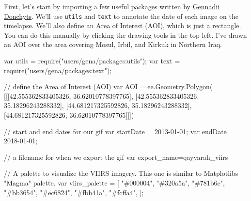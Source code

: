 \documentclass[
  letterpaper,
  DIV=11,
  numbers=noendperiod]{scrreprt}
\newenvironment{Shaded}{\begin{snugshade}}{\end{snugshade}}
\newcommand{\AttributeTok}[1]{\textcolor[rgb]{0.40,0.45,0.13}{#1}}
\newcommand{\CommentTok}[1]{\textcolor[rgb]{0.37,0.37,0.37}{#1}}
\newcommand{\FloatTok}[1]{\textcolor[rgb]{0.68,0.00,0.00}{#1}}
\newcommand{\FunctionTok}[1]{\textcolor[rgb]{0.28,0.35,0.67}{#1}}
\newcommand{\KeywordTok}[1]{\textcolor[rgb]{0.00,0.23,0.31}{#1}}
\newcommand{\NormalTok}[1]{\textcolor[rgb]{0.00,0.23,0.31}{#1}}
\newcommand{\OperatorTok}[1]{\textcolor[rgb]{0.37,0.37,0.37}{#1}}
\newcommand{\PreprocessorTok}[1]{\textcolor[rgb]{0.68,0.00,0.00}{#1}}
\newcommand{\StringTok}[1]{\textcolor[rgb]{0.13,0.47,0.30}{#1}}
\begin{document}
First, let's start by importing a few useful packages written by
\href{https://twitter.com/gena_d}{Gennadii Donchyts}. We'll use
\texttt{utils} and \texttt{text} to annotate the date of each image on
the timelapse. We'll also define an Area of Interest (AOI), which is
just a rectangle. You can do this manually by clicking the drawing tools
in the top left. I've drawn an AOI over the area covering Mosul, Irbil,
and Kirkuk in Northern Iraq.

\begin{Shaded}
\begin{Highlighting}[]
\KeywordTok{var}\NormalTok{ utils }\OperatorTok{=} \PreprocessorTok{require}\NormalTok{(}\StringTok{"users/gena/packages:utils"}\NormalTok{)}\OperatorTok{;}
\KeywordTok{var}\NormalTok{ text }\OperatorTok{=} \PreprocessorTok{require}\NormalTok{(}\StringTok{"users/gena/packages:text"}\NormalTok{)}\OperatorTok{;}

\CommentTok{// define the Area of Interest (AOI)}
\KeywordTok{var}\NormalTok{ AOI }\OperatorTok{=}\NormalTok{ ee}\OperatorTok{.}\AttributeTok{Geometry}\OperatorTok{.}\FunctionTok{Polygon}\NormalTok{(}
\NormalTok{        [[[}\FloatTok{42.555362833405326}\OperatorTok{,} \FloatTok{36.62010778397765}\NormalTok{]}\OperatorTok{,}
\NormalTok{          [}\FloatTok{42.555362833405326}\OperatorTok{,} \FloatTok{35.18296243288332}\NormalTok{]}\OperatorTok{,}
\NormalTok{          [}\FloatTok{44.681217325592826}\OperatorTok{,} \FloatTok{35.18296243288332}\NormalTok{]}\OperatorTok{,}
\NormalTok{          [}\FloatTok{44.681217325592826}\OperatorTok{,} \FloatTok{36.62010778397765}\NormalTok{]]])}

\CommentTok{// start and end dates for our gif }
\KeywordTok{var}\NormalTok{ startDate }\OperatorTok{=} \StringTok{\textquotesingle{}2013{-}01{-}01\textquotesingle{}}\OperatorTok{;}
\KeywordTok{var}\NormalTok{ endDate }\OperatorTok{=} \StringTok{\textquotesingle{}2018{-}01{-}01\textquotesingle{}}\OperatorTok{;}

\CommentTok{// a filename for when we export the gif}
\KeywordTok{var}\NormalTok{ export\_name}\OperatorTok{=}\StringTok{\textquotesingle{}qayyarah\_viirs\textquotesingle{}}
          
\CommentTok{// A palette to visualize the VIIRS imagery. This one is similar to Matplotlib\textquotesingle{}s "Magma" palette. }
\KeywordTok{var}\NormalTok{ viirs\_palette }\OperatorTok{=}\NormalTok{ [}
  \StringTok{"\#000004"}\OperatorTok{,}
  \StringTok{"\#320a5a"}\OperatorTok{,}
  \StringTok{"\#781b6c"}\OperatorTok{,}
  \StringTok{"\#bb3654"}\OperatorTok{,}
  \StringTok{"\#ec6824"}\OperatorTok{,}
  \StringTok{"\#fbb41a"}\OperatorTok{,}
  \StringTok{"\#fcffa4"}\OperatorTok{,}
\NormalTok{]}\OperatorTok{;}


\end{Highlighting}
\end{Shaded}
\end{document}
